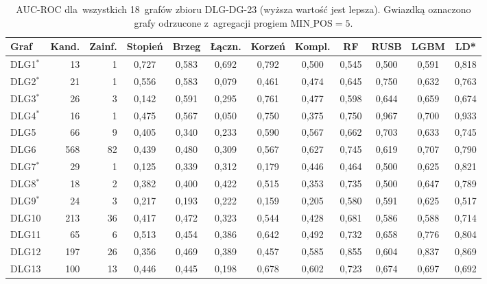 \begin{table}[ht]
\centering
\caption[AUC-ROC dla~wszystkich 18~grafów DLG-DG-23]{AUC-ROC dla~wszystkich 18~grafów zbioru DLG-DG-23 (wyższa wartość jest lepsza). Gwiazdką oznaczono grafy odrzucone z~agregacji progiem $\mathrm{MIN\_POS} = 5$.}
\label{tab:dodb-auc-roc}
\footnotesize
\setlength{\tabcolsep}{3.5pt}
\begin{tabular}{lrrccccccccc}
\toprule
\textbf{Graf} & \textbf{Kand.} & \textbf{Zainf.} & \textbf{Stopień} & \textbf{Brzeg} & \textbf{Łączn.} & \textbf{Korzeń} & \textbf{Kompl.} & \textbf{RF} & \textbf{RUSB} & \textbf{LGBM} & \textbf{LD*} \\
\midrule
DLG1$^{*}$ & 13 & 1 & 0{,}727 & 0{,}583 & 0{,}692 & 0{,}792 & 0{,}500 & 0{,}545 & 0{,}500 & 0{,}591 & 0{,}818 \\
DLG2$^{*}$ & 21 & 1 & 0{,}556 & 0{,}583 & 0{,}079 & 0{,}461 & 0{,}474 & 0{,}645 & 0{,}750 & 0{,}632 & 0{,}763 \\
DLG3$^{*}$ & 26 & 3 & 0{,}142 & 0{,}591 & 0{,}295 & 0{,}761 & 0{,}477 & 0{,}598 & 0{,}644 & 0{,}659 & 0{,}674 \\
DLG4$^{*}$ & 16 & 1 & 0{,}475 & 0{,}567 & 0{,}050 & 0{,}750 & 0{,}375 & 0{,}750 & 0{,}967 & 0{,}700 & 0{,}933 \\
DLG5 & 66 & 9 & 0{,}405 & 0{,}340 & 0{,}233 & 0{,}590 & 0{,}567 & 0{,}662 & 0{,}703 & 0{,}633 & 0{,}745 \\
DLG6 & 568 & 82 & 0{,}439 & 0{,}480 & 0{,}309 & 0{,}567 & 0{,}627 & 0{,}745 & 0{,}619 & 0{,}707 & 0{,}790 \\
DLG7$^{*}$ & 29 & 1 & 0{,}125 & 0{,}339 & 0{,}312 & 0{,}179 & 0{,}446 & 0{,}464 & 0{,}500 & 0{,}625 & 0{,}821 \\
DLG8$^{*}$ & 18 & 2 & 0{,}382 & 0{,}400 & 0{,}422 & 0{,}515 & 0{,}353 & 0{,}735 & 0{,}500 & 0{,}647 & 0{,}789 \\
DLG9$^{*}$ & 24 & 3 & 0{,}217 & 0{,}193 & 0{,}222 & 0{,}159 & 0{,}205 & 0{,}580 & 0{,}591 & 0{,}625 & 0{,}517 \\
DLG10 & 213 & 36 & 0{,}417 & 0{,}472 & 0{,}323 & 0{,}544 & 0{,}428 & 0{,}681 & 0{,}586 & 0{,}588 & 0{,}714 \\
DLG11 & 65 & 6 & 0{,}513 & 0{,}454 & 0{,}386 & 0{,}642 & 0{,}492 & 0{,}732 & 0{,}658 & 0{,}776 & 0{,}804 \\
DLG12 & 197 & 26 & 0{,}356 & 0{,}469 & 0{,}389 & 0{,}457 & 0{,}585 & 0{,}855 & 0{,}604 & 0{,}837 & 0{,}869 \\
DLG13 & 100 & 13 & 0{,}446 & 0{,}445 & 0{,}198 & 0{,}678 & 0{,}602 & 0{,}723 & 0{,}674 & 0{,}697 & 0{,}692 \\

\end{tabular}
\end{table}

